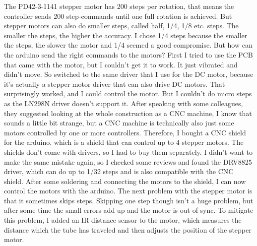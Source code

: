 The PD42-3-1141 stepper motor has 200 steps per rotation, that means the controller sends 200 step-commands until one full rotation is achieved.
But stepper motors can also do smaller steps, called half, 1/4, 1/8 etc. steps.
The smaller the steps, the higher the accuracy.
I chose 1/4 steps because the smaller the steps, the slower the motor and 1/4 seemed a good compromise.
But how can the arduino send the right commands to the motors?
First I tried to use the PCB that came with the motor, but I couldn't get it to work.
It just vibrated and didn't move.
So switched to the same driver that I use for the DC motor, because it's actually a stepper motor driver that can also drive DC motors.
That surprisingly worked, and I could control the motor.
But I couldn't do micro steps as the LN298N driver doesn't support it.
After speaking with some colleagues, they suggested looking at the whole construction as a CNC machine, I know that sounds a little bit strange, but a CNC machine is technically also just some motors controlled by one or more controllers.
Therefore, I bought a CNC shield for the arduino, which is a shield that can control up to 4 stepper motors.
The shields don't come with drivers, so I had to buy them separately.
I didn't want to make the same mistake again, so I checked some reviews and found the DRV8825\autocite{drv8825} driver, which can do up to 1/32 steps and is also compatible with the CNC shield.
After some soldering and connecting the motors to the shield, I can now control the motors with the arduino.
The next problem with the stepper motor is that it sometimes skips steps.
Skipping one step though isn't a huge problem, but after some time the small errors add up and the motor is out of sync.
To mitigate this problem, I added an IR distance sensor to the motor, which measures the distance which the tube has traveled and then adjusts the position of the stepper motor.

